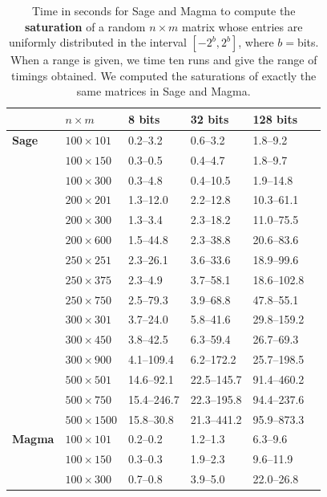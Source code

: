 \documentclass[preprint,12pt]{elsarticle}
\theoremstyle{plain}
\theoremstyle{definition}
\numberwithin{equation}{section}
\numberwithin{figure}{section}
\numberwithin{table}{section}
\begin{document}
{ 
\begin{table}[ht]
  \caption{Time in seconds for Sage and Magma to compute the {\bf saturation} of a random $n\times m $ matrix whose entries are uniformly distributed in the interval $[-2^b,2^b]$, where $b=$bits.
When a range is given, we time ten runs and give the range of timings obtained.
We computed the saturations of exactly the same matrices in Sage and Magma.
\label{tab2}}
\begin{center}

\begin{tabular}{|l|l|l|l|l|l|}\hline
& $n \times m $ & 8 bits & 32 bits  & 128 bits  \\\hline 
{\bf Sage}  
& $100 \times 101$ & 0.2--3.2 & 0.6--3.2 & 1.8--9.2\\
& $100 \times 150$ & 0.3--0.5 & 0.4--4.7 & 1.8--9.7\\
& $100 \times 300$ & 0.3--4.8 & 0.4--10.5 & 1.9--14.8\\
& $200 \times 201$ & 1.3--12.0 & 2.2--12.8 & 10.3--61.1\\
& $200 \times 300$ & 1.3--3.4 & 2.3--18.2 & 11.0--75.5\\
& $200 \times 600$ & 1.5--44.8 & 2.3--38.8 & 20.6--83.6\\
& $250 \times 251$ & 2.3--26.1 & 3.6--33.6 & 18.9--99.6\\
& $250 \times 375$ & 2.3--4.9 & 3.7--58.1 & 18.6--102.8\\
& $250 \times 750$ & 2.5--79.3 & 3.9--68.8 & 47.8--55.1\\
& $300 \times 301$ & 3.7--24.0 & 5.8--41.6 & 29.8--159.2\\
& $300 \times 450$ & 3.8--42.5 & 6.3--59.4 & 26.7--69.3\\
& $300 \times 900$ & 4.1--109.4 & 6.2--172.2 & 25.7--198.5\\
& $500 \times 501$ & 14.6--92.1 & 22.5--145.7 & 91.4--460.2\\
& $500 \times 750$ & 15.4--246.7 & 22.3--195.8 & 94.4--237.6\\
& $500 \times 1500$ & 15.8--30.8 & 21.3--441.2 & 95.9--873.3\\
\hline
{\bf Magma} 
& $100 \times 101$ & 0.2--0.2 & 1.2--1.3 & 6.3--9.6\\
& $100 \times 150$ & 0.3--0.3 & 1.9--2.3 & 9.6--11.9\\
& $100 \times 300$ & 0.7--0.8 & 3.9--5.0 & 22.0--26.8\\

\end{tabular}
\end{center}
\end{table}}
\end{document}
